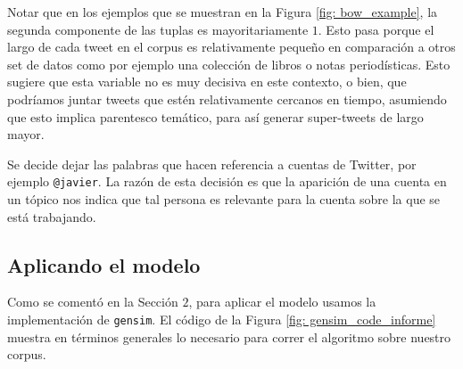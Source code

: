 \documentclass{article}
\begin{document}
	\begin{remark}
		Notar que en los ejemplos que se muestran en la Figura \ref{fig: bow_example}, la segunda componente de las tuplas es mayoritariamente $1$. Esto pasa porque el largo de cada tweet en el corpus es relativamente pequeño en comparación a otros set de datos como por ejemplo una colección de libros o notas periodísticas. Esto sugiere que esta variable no es muy decisiva en este contexto, o bien, que podríamos juntar tweets que estén relativamente cercanos en tiempo, asumiendo que esto implica parentesco temático, para así generar super-tweets de largo mayor. 
	\end{remark}

	\begin{remark}
		Se decide dejar las palabras que hacen referencia a cuentas de Twitter, por ejemplo \texttt{@javier}. La razón de esta decisión es que la aparición de una cuenta en un tópico nos indica que tal persona es relevante para la cuenta sobre la que se está trabajando.
	\end{remark}

\subsection{Aplicando el modelo}
	Como se comentó en la Sección $2$, para aplicar el modelo usamos la implementación de \texttt{gensim}. El código de la Figura \ref{fig: gensim_code_informe} muestra en términos generales lo necesario para correr el algoritmo sobre nuestro corpus.
	
\end{document}
